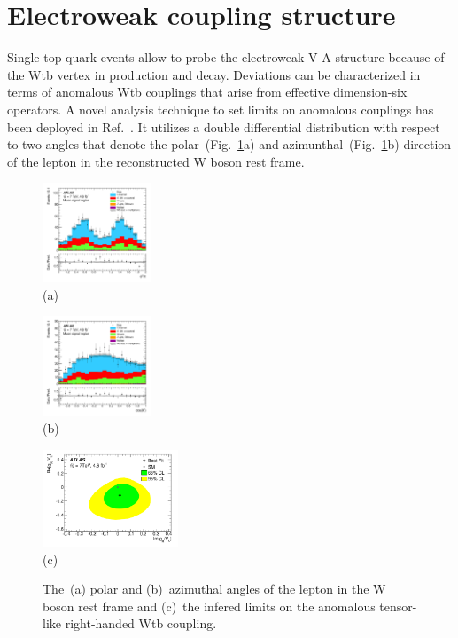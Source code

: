 \documentclass{PoS}
\begin{document}
\section{Electroweak coupling structure}
Single top quark events allow to probe the electroweak V-A structure because of the Wtb vertex in production and decay. Deviations can be characterized in terms of anomalous Wtb couplings that arise from effective dimension-six operators. A novel analysis technique to set limits on anomalous couplings has been deployed in Ref.~\cite{atlas-anomcoupl}. It utilizes a double differential distribution with respect to two angles that denote the polar~(Fig.~\ref{fig:angles}a) and azimunthal~(Fig.~\ref{fig:angles}b) direction of the lepton in the reconstructed W boson rest frame.


\begin{figure}[htbp]
\begin{center}
\parbox[t]{0.3\textwidth}{\centering\includegraphics[width=0.29\textwidth]{atlas_anomcoupl/phi.pdf}\\(a)}
\parbox[t]{0.3\textwidth}{\centering\includegraphics[width=0.29\textwidth]{atlas_anomcoupl/theta.pdf}\\(b)}
\parbox[t]{0.38\textwidth}{\centering\includegraphics[width=0.36\textwidth]{atlas_anomcoupl/limits.pdf}\\(c)}
\end{center}
\caption{\label{fig:angles}The~(a) polar and (b)~azimuthal angles of the lepton in the W boson rest frame and (c)~the infered limits on the anomalous tensor-like right-handed Wtb coupling.}
\end{figure}
\end{document}
